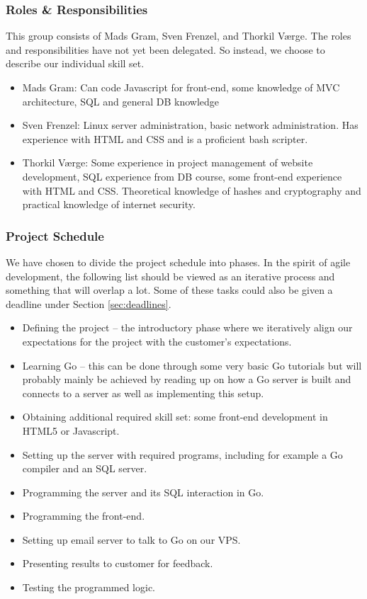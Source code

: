 \documentclass[11pt,a4paper]{report}
\begin{document}
\subsubsection{Roles \& Responsibilities}
This group consists of Mads Gram, Sven Frenzel, and Thorkil Værge. The roles and responsibilities have not yet been delegated. So instead, we choose to describe our individual skill set.
\begin{itemize}
\item Mads Gram: Can code Javascript for front-end, some knowledge of MVC architecture, SQL and general DB knowledge
\item Sven Frenzel: Linux server administration, basic network administration. Has experience with HTML and CSS and is a proficient bash scripter.
\item Thorkil Værge: Some experience in project management of website development, SQL experience from DB course, some front-end experience with HTML and CSS. Theoretical knowledge of hashes and cryptography and practical knowledge of internet security.
\end{itemize}
\subsubsection{Project Schedule}
We have chosen to divide the project schedule into phases. In the spirit of agile development, the following list should be viewed as an iterative process and something that will overlap a lot. Some of these tasks could also be given a deadline under Section \ref{sec:deadlines}.
\begin{itemize}
\item Defining the project -- the introductory phase where we iteratively align our expectations for the project with the customer's expectations.
\item Learning Go -- this can be done through some very basic Go tutorials but will probably mainly be achieved by reading up on how a Go server is built and connects to a server as well as implementing this setup.
\item Obtaining additional required skill set: some front-end development in HTML5 or Javascript.
\item Setting up the server with required programs, including for example a Go compiler and an SQL server.
\item Programming the server and its SQL interaction in Go.
\item Programming the front-end.
\item Setting up email server to talk to Go on our VPS.
\item Presenting results to customer for feedback.
\item Testing the programmed logic.
\end{itemize}
\end{document}
